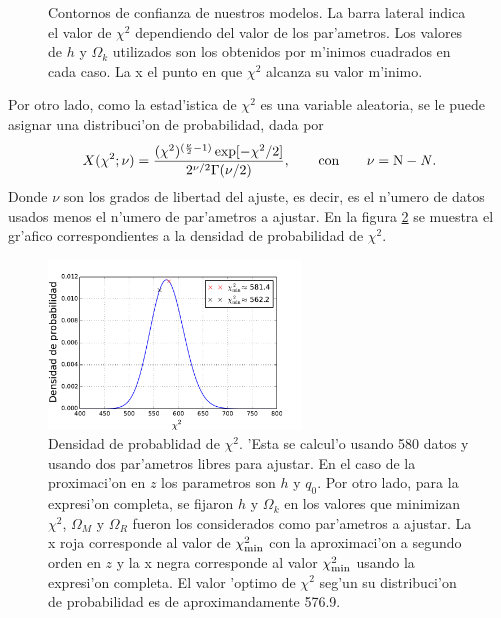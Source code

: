 \begin{figure}[h]
 \caption{Contornos de confianza de nuestros modelos. La barra lateral indica el valor de $\chi^2$ dependiendo del valor de los par'ametros. Los
 valores de $h$ y $\Omega_k$ utilizados son los obtenidos por m'inimos cuadrados en cada caso. La x el punto en que $\chi^2$ alcanza su valor m'inimo.}
  \label{parametros22}
\end{figure}

Por otro lado, como la estad'istica de $\chi^2$ es una variable aleatoria, se le puede asignar una distribuci'on de probabilidad, dada por
\begin{eqnarray}
X(\chi^2;\nu)= \frac{(\chi^2)^{(\frac{\nu}{2}-1)}\exp[-\chi^2/2]}{2^{\nu/2}\Gamma(\nu/2)}, \qquad \mbox{con} \qquad \nu=\mbox{N}-\mbox{\textit{N}}.
\end{eqnarray}
Donde $\nu$ son los grados de libertad del ajuste, es decir, es el n'umero de datos usados menos el n'umero de par'ametros a ajustar. En la
figura \ref{parametros3} se muestra el gr'afico correspondientes a la densidad de probabilidad de $\chi^2$.\\ 
\begin{figure}[h!]
  \centering
\includegraphics[width=0.60\textwidth]{fig/densidadq0.pdf}
 \caption{Densidad de probablidad de $\chi^2$. 'Esta se calcul'o usando 580 datos y usando dos par'ametros libres para ajustar. En el caso de la proximaci'on en 
 $z$ los parametros son $h$ y $q_0$. Por otro lado, para la expresi'on completa, se fijaron $h$ y $\Omega_k$ en los valores que minimizan $\chi^2$, $\Omega_M$ y $\Omega_R$ fueron los considerados como par'ametros a ajustar.
 La x roja corresponde al valor de $\chi^2_{\rm{min}}$ con la aproximaci'on a segundo orden en $z$ y la x negra corresponde al valor $\chi^2_{\rm{min}}$ usando la expresi'on completa. El valor 'optimo de $\chi^2$ seg'un su 
 distribuci'on de probabilidad es de aproximandamente 576.9.} 
  \label{parametros3}
\end{figure}\\         
